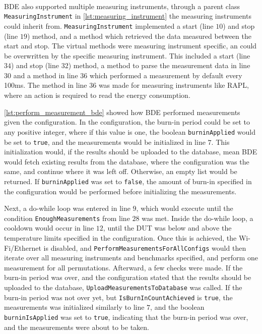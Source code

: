 \paragraph*{}
BDE also supported multiple measuring instruments, through a parent class \texttt{MeasuringInstrument} in \cref{lst:measuring_instrument} the measuring instruments could inherit from. \texttt{MeasuringInstrument} implemented a start (line $10$) and stop (line $19$) method, and a method which retrieved the data measured between the start and stop. The virtual methods were measuring instrument specific, an could be overwritten by the specific measuring instrument. This included a start (line $34$) and stop (line $32$) method, a method to parse the measurement data in line $30$ and a method in line $36$ which performed a measurement by default every 100ms. The method in line $36$ was made for measuring instruments like RAPL, where an action is required to read the energy consumption.
\newpage



\cref{lst:perform_measurement_bde} showed how BDE performed measurements given the configuration. In the configuration, the burn-in period could be set to any positive integer, where if this value is one, the boolean \texttt{burninApplied} would be set to \texttt{true}, and the measurements would be initialized in line $7$. This initialization would, if the results should be uploaded to the database, mean BDE would fetch existing results from the database, where the configuration was the same, and continue where it was left off. Otherwise, an empty list would be returned. If \texttt{burninApplied} was set to \texttt{false}, the amount of burn-in specified in the configuration would be performed before initializing the measurements.

Next, a do-while loop was entered in line $9$, which would execute until the condition \texttt{EnoughMeasurements} from line $28$ was met. Inside the do-while loop, a cooldown would occur in line $12$, until the DUT was below and above the temperature limits specified in the configuration. Once this is achieved, the Wi-Fi/Ethernet is disabled, and \texttt{PerformMeasurementsForAllConfigs} would then iterate over all measuring instruments and benchmarks specified, and perform one measurement for all permutations. Afterward, a few checks were made. If the burn-in period was over, and the configuration stated that the results should be uploaded to the database, \texttt{UploadMeasurementsToDatabase} was called. If the burn-in period was not over yet, but \texttt{IsBurnInCountAchieved} is \texttt{true}, the measurements was initialized similarly to line $7$, and the boolean \texttt{burninIsApplied} was set to \texttt{true}, indicating that the burn-in period was over, and the measurements were about to be taken. 
